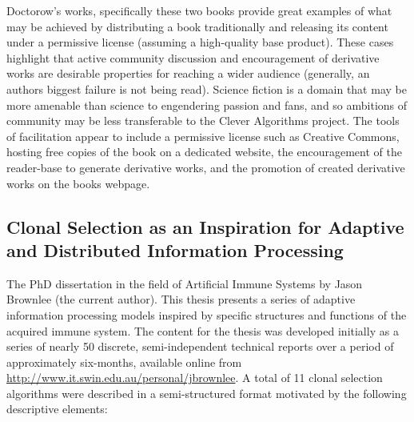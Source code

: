 \documentclass[a4paper, 11pt]{article}
\begin{document}
Doctorow's works, specifically these two books provide great examples of what may be achieved by distributing a book traditionally and releasing its content under a permissive license (assuming a high-quality base product). These cases highlight that active community discussion and encouragement of derivative works are desirable properties for reaching a wider audience (generally, an authors biggest failure is not being read). Science fiction is a domain that may be more amenable than science to engendering passion and fans, and so ambitions of community may be less transferable to the Clever Algorithms project. The tools of facilitation appear to include a permissive license such as Creative Commons, hosting free copies of the book on a dedicated website, the encouragement of the reader-base to generate derivative works, and the promotion of created derivative works on the books webpage.

% 
% 
\subsection{Clonal Selection as an Inspiration for Adaptive and Distributed Information Processing}
\label{subsec:dissertation}
The PhD dissertation in the field of Artificial Immune Systems by Jason Brownlee \cite{Brownlee2008} (the current author). This thesis presents a series of adaptive information processing models inspired by specific structures and functions of the acquired immune system. The content for the thesis was developed initially as a series of nearly 50 discrete, semi-independent technical reports over a period of approximately six-months, available online from \url{http://www.it.swin.edu.au/personal/jbrownlee}. A total of 11 clonal selection algorithms were described in a semi-structured format motivated by the following descriptive elements:
\end{document}
